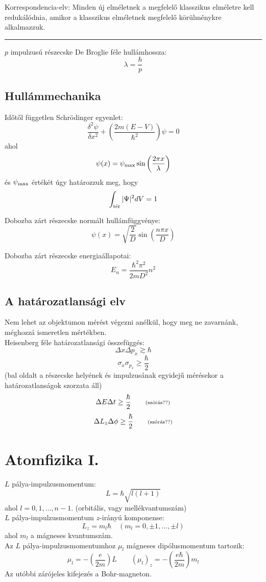 \documentclass[12pt,a4paper,twocolumn]{article}
\begin{document}
  Korrespondencia-elv: Minden új elméletnek a megfelelő klasszikus elméletre kell redukálódnia, amikor a klasszikus
  elméletnek megfelelő körülménykre alkalmazzuk.

  \begin{center}\rule{235pt}{0.3pt}\end{center}

  $p$ impulzusú részecske De Broglie féle hullámhossza:
  \[\lambda = \frac{h}{p}\]

  \subsection{Hullámmechanika}

  Időtől független Schrödinger egyenlet:
  \[\frac{\delta^2 \psi}{\delta x^2} + \left(\frac{2m(E-V)}{\hbar^2}\right)\psi = 0\]
  ahol
  \[\psi(x) = \psi_{\hbox{\scriptsize max}} \sin\left(\frac{2\pi x}{\lambda}\right)\]
  és $\psi_{\hbox{\scriptsize max}}$ értékét úgy határozzuk meg, hogy
  \[\int_{\hbox{\scriptsize tér}} |\Psi|^2 dV = 1\]

  Dobozba zárt részecske normált hullámfüggvénye:
  \[\psi(x) = \sqrt{\frac{2}{D}}\sin\left(\frac{n\pi x}{D}\right)\]

  Dobozba zárt részecske energiaállapotai:
  \[E_n = \frac{\hbar^2\pi^2}{2mD^2}n^2\]

  \subsection{A határozatlansági elv}

  Nem lehet az objektumon mérést végezni anélkül, hogy meg ne zavarnánk, méghozzá ismeretlen mértékben.\\

  Heisenberg féle határozatlansági összefüggés:
  \[\Delta x \Delta p_x \gtrsim \hbar\]
  \[\sigma_x \sigma_{p_x} \geq \frac{\hbar}{2}\]
  (bal oldalt a részecske helyének és impulzusának egyidejű mérésekor a határozatlanságok szorzata áll)
  \[\Delta E \Delta t \geq \frac{\hbar}{2} \qquad \hbox{\scriptsize (szórás??)}\]
  \[\Delta L_z \Delta \phi \geq \frac{\hbar}{2} \qquad \hbox{\scriptsize (szórás??)}\]

  \section{Atomfizika I.}

  $L$ pálya-impulzusmomentum:
  \[L = \hbar\sqrt{l(l+1)}\]
  ahol $l = 0, 1, \ldots, n-1$. (orbitális, vagy mellékvantumszám)\\
  $L$ pálya-impulzusmomentum $z$-irányú komponense:
  \[L_z = m_l\hbar \quad (m_l = 0, \pm1, \ldots, \pm l)\]
  ahol $m_l$ a mágneses kvantumszám.\\
  Az $L$ pálya-impulzusmomentumhoz $\mu_l$ mágneses dipólusmomentum tartozik:
  \[\mu_l = -\left(\frac{e}{2m}\right)L \qquad (\mu_l)_z = -\left(\frac{e\hbar}{2m}\right)m_l\]
  Az utóbbi zárójeles kifejezés a Bohr-magneton.\\
\end{document}
